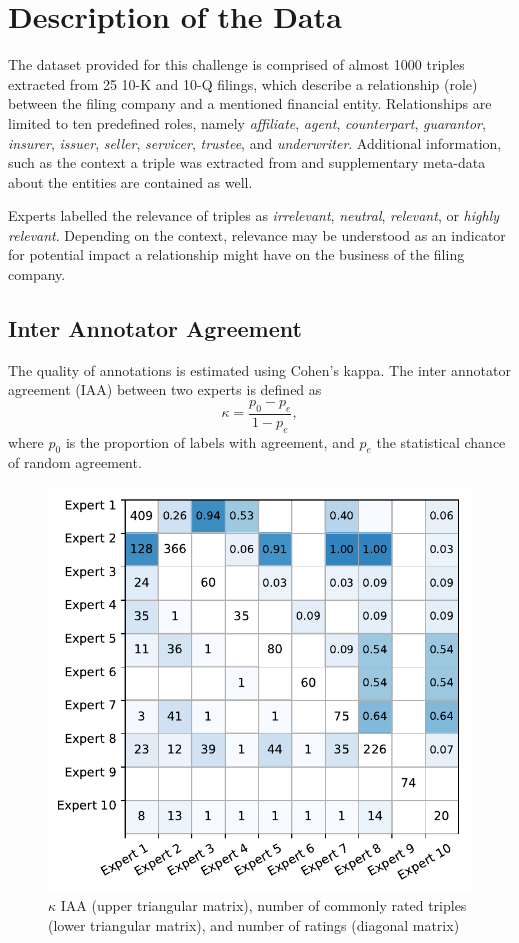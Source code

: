 \section{Description of the Data}
The dataset provided for this challenge is comprised of almost 1000 triples extracted from 25 10-K and 10-Q filings, which describe a relationship (role) between the filing company and a mentioned financial entity. Relationships are limited to ten predefined roles, namely \textit{affiliate}, \textit{agent}, \textit{counterpart}, \textit{guarantor}, \textit{insurer}, \textit{issuer}, \textit{seller}, \textit{servicer}, \textit{trustee}, and \textit{underwriter}. Additional information, such as the context a triple was extracted from and supplementary meta-data about the entities are contained as well.

Experts labelled the relevance of triples as \textit{irrelevant}, \textit{neutral}, \textit{relevant}, or \textit{highly relevant}. Depending on the context, relevance may be understood as an indicator for potential impact a relationship might have on the business of the filing company. 


\subsection{Inter Annotator Agreement}
The quality of annotations is estimated using Cohen's kappa. The inter annotator agreement (IAA) between two experts is defined as
$$
\kappa = \frac{p_0-p_e}{1-p_e},
$$
where $p_0$ is the proportion of labels with agreement, and $p_e$ the statistical chance of random agreement.

\begin{figure}
	\includegraphics[width=0.7\linewidth]{iaa}
	\caption{$\kappa$ IAA (upper triangular matrix), number of commonly rated triples (lower triangular matrix), and number of ratings (diagonal matrix)}
	\label{fig:iaa}
\end{figure}

